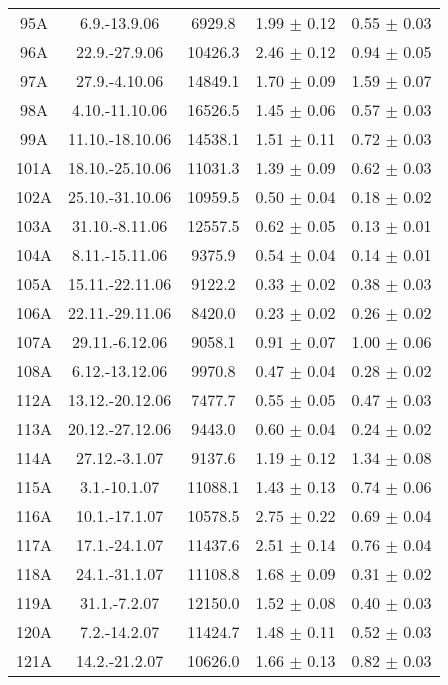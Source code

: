 \documentclass[a4paper,12pt]{article}
\begin{document}
\begin{center}
\begin{longtable}{|c|c|c|c|c|}
    95A	&	6.9.-13.9.06	&	6929.8	&	1.99 $\pm$ 0.12	&	0.55 $\pm$ 0.03	\\
    96A	&	22.9.-27.9.06	&	10426.3	&	2.46 $\pm$ 0.12	&	0.94 $\pm$ 0.05	\\
    97A	&	27.9.-4.10.06	&	14849.1	&	1.70 $\pm$ 0.09	&	1.59 $\pm$ 0.07	\\
    98A	&	4.10.-11.10.06	&	16526.5	&	1.45 $\pm$ 0.06	&	0.57 $\pm$ 0.03	\\
    99A	&	11.10.-18.10.06	&	14538.1	&	1.51 $\pm$ 0.11	&	0.72 $\pm$ 0.03	\\
    101A	&	18.10.-25.10.06	&	11031.3	&	1.39 $\pm$ 0.09	&	0.62 $\pm$ 0.03	\\
    102A	&	25.10.-31.10.06	&	10959.5	&	0.50 $\pm$ 0.04	&	0.18 $\pm$ 0.02	\\
    103A	&	31.10.-8.11.06	&	12557.5	&	0.62 $\pm$ 0.05	&	0.13 $\pm$ 0.01	\\
    104A	&	8.11.-15.11.06	&	9375.9	&	0.54 $\pm$ 0.04	&	0.14 $\pm$ 0.01	\\
    105A	&	15.11.-22.11.06	&	9122.2	&	0.33 $\pm$ 0.02	&	0.38 $\pm$ 0.03	\\
    106A	&	22.11.-29.11.06	&	8420.0	&	0.23 $\pm$ 0.02	&	0.26 $\pm$ 0.02	\\
    107A	&	29.11.-6.12.06	&	9058.1	&	0.91 $\pm$ 0.07	&	1.00 $\pm$ 0.06	\\
    108A	&	6.12.-13.12.06	&	9970.8	&	0.47 $\pm$ 0.04	&	0.28 $\pm$ 0.02	\\
    112A	&	13.12.-20.12.06	&	7477.7	&	0.55 $\pm$ 0.05	&	0.47 $\pm$ 0.03	\\
    113A	&	20.12.-27.12.06	&	9443.0	&	0.60 $\pm$ 0.04	&	0.24 $\pm$ 0.02	\\
    114A	&	27.12.-3.1.07	&	9137.6	&	1.19 $\pm$ 0.12	&	1.34 $\pm$ 0.08	\\
    115A	&	3.1.-10.1.07	&	11088.1	&	1.43 $\pm$ 0.13	&	0.74 $\pm$ 0.06	\\
    116A	&	10.1.-17.1.07	&	10578.5	&	2.75 $\pm$ 0.22	&	0.69 $\pm$ 0.04	\\
    117A	&	17.1.-24.1.07	&	11437.6	&	2.51 $\pm$ 0.14	&	0.76 $\pm$ 0.04	\\
    118A	&	24.1.-31.1.07	&	11108.8	&	1.68 $\pm$ 0.09	&	0.31 $\pm$ 0.02	\\
    119A	&	31.1.-7.2.07	&	12150.0	&	1.52 $\pm$ 0.08	&	0.40 $\pm$ 0.03	\\
    120A	&	7.2.-14.2.07	&	11424.7	&	1.48 $\pm$ 0.11	&	0.52 $\pm$ 0.03	\\
    121A	&	14.2.-21.2.07	&	10626.0	&	1.66 $\pm$ 0.13	&	0.82 $\pm$ 0.03	\\

\end{longtable}
\end{center}
\end{document}
